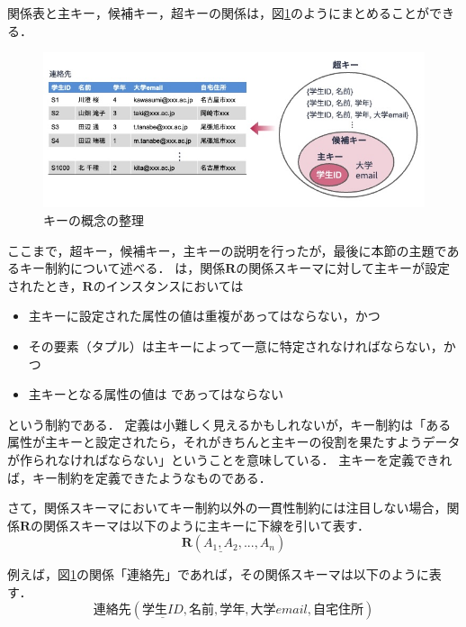 関係表と主キー，候補キー，超キーの関係は，図\ref{fig:key-concept-mapping}のようにまとめることができる．
\begin{figure}[tb]
    \centering
    \includegraphics[width=1.0\textwidth]{figure/key-concept-mapping.jpg}
    \caption{キーの概念の整理}
    \label{fig:key-concept-mapping}
\end{figure}

ここまで，超キー，候補キー，主キーの説明を行ったが，最後に本節の主題であるキー制約について述べる．
 は，関係$\boldsymbol{R}$の関係スキーマに対して主キーが設定されたとき，$\boldsymbol{R}$のインスタンスにおいては
\begin{itemize}
\item 主キーに設定された属性の値は重複があってはならない，かつ
\item その要素（タプル）は主キーによって一意に特定されなければならない，かつ
\item 主キーとなる属性の値は であってはならない
\end{itemize}
という制約である．
定義は小難しく見えるかもしれないが，キー制約は「ある属性が主キーと設定されたら，それがきちんと主キーの役割を果たすようデータが作られなければならない」ということを意味している．
主キーを定義できれば，キー制約を定義できたようなものである．

さて，関係スキーマにおいてキー制約以外の一貫性制約には注目しない場合，関係$\boldsymbol{R}$の関係スキーマは以下のように主キーに下線を引いて表す．
\begin{equation}
\boldsymbol{R}(\underline{A_1, A_2}, ..., A_n)
\end{equation}

例えば，図\ref{fig:key-concept-mapping}の関係「連絡先」であれば，その関係スキーマは以下のように表す．
\begin{equation}
連絡先(\underline{学生ID}, 名前, 学年, 大学email, 自宅住所)
\end{equation}



